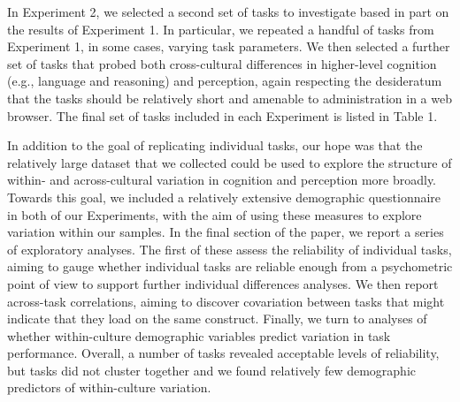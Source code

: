 \documentclass[
  man,floatsintext]{apa6}
\begin{document}
In Experiment 2, we selected a second set of tasks to investigate based in part on the results of Experiment 1. In particular, we repeated a handful of tasks from Experiment 1, in some cases, varying task parameters. We then selected a further set of tasks that probed both cross-cultural differences in higher-level cognition (e.g., language and reasoning) and perception, again respecting the desideratum that the tasks should be relatively short and amenable to administration in a web browser. The final set of tasks included in each Experiment is listed in Table 1.

In addition to the goal of replicating individual tasks, our hope was that the relatively large dataset that we collected could be used to explore the structure of within- and across-cultural variation in cognition and perception more broadly. Towards this goal, we included a relatively extensive demographic questionnaire in both of our Experiments, with the aim of using these measures to explore variation within our samples. In the final section of the paper, we report a series of exploratory analyses. The first of these assess the reliability of individual tasks, aiming to gauge whether individual tasks are reliable enough from a psychometric point of view to support further individual differences analyses. We then report across-task correlations, aiming to discover covariation between tasks that might indicate that they load on the same construct. Finally, we turn to analyses of whether within-culture demographic variables predict variation in task performance. Overall, a number of tasks revealed acceptable levels of reliability, but tasks did not cluster together and we found relatively few demographic predictors of within-culture variation.
\end{document}
